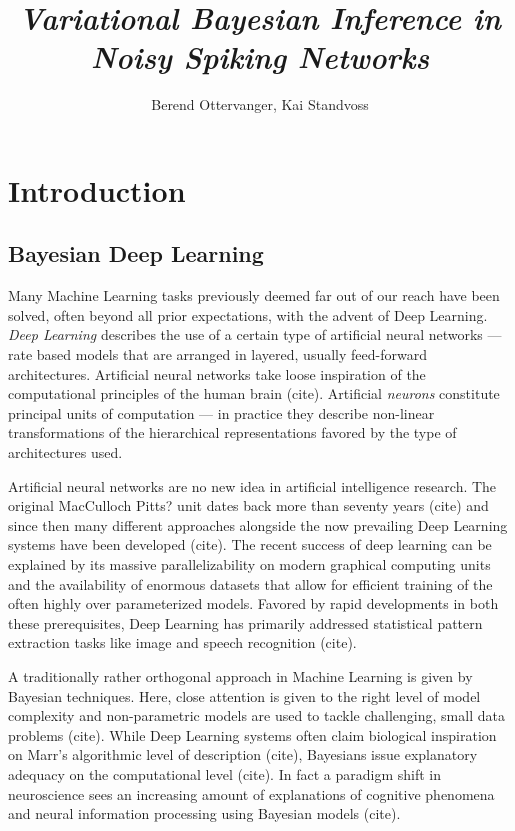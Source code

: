 \documentclass[10pt,a4paper,twocolumn]{article}
\begin{document}
\title{\textit{Variational Bayesian Inference in Noisy Spiking Networks}}
\author{Berend Ottervanger, Kai Standvoss}

\maketitle
\thispagestyle{fancy}
\begin{abstract}


\end{abstract}
\section{Introduction}
\subsection{Bayesian Deep Learning}
Many Machine Learning tasks previously deemed far out of our reach have been solved, often beyond all prior expectations, with the advent of Deep Learning. \emph{Deep Learning} describes the use of a certain type of artificial neural networks --- rate based models that are arranged in layered, usually feed-forward architectures. Artificial neural networks take loose inspiration of the computational principles of the human brain (cite). Artificial \emph{neurons} constitute principal units of computation --- in practice they describe non-linear transformations of the hierarchical representations favored by the type of architectures used. 

Artificial neural networks are no new idea in artificial intelligence research. The original MacCulloch Pitts? unit dates back more than seventy years (cite) and since then many different approaches alongside the now prevailing Deep Learning systems have been developed (cite). The recent success of deep learning can be explained by its massive parallelizability on modern graphical computing units and the availability of enormous datasets that allow for efficient training of the often highly over parameterized models. Favored by rapid developments in both these prerequisites, Deep Learning has primarily addressed statistical pattern extraction tasks like image and speech recognition (cite).

A traditionally rather orthogonal approach in Machine Learning is given by Bayesian techniques. Here, close attention is given to the right level of model complexity and non-parametric models are used to tackle challenging, small data problems (cite). While Deep Learning systems often claim biological inspiration on Marr's algorithmic level of description (cite), Bayesians issue explanatory adequacy on  the computational level (cite). In fact a paradigm shift in neuroscience sees an increasing amount of explanations of cognitive phenomena and neural information processing using Bayesian models (cite).
\end{document}
